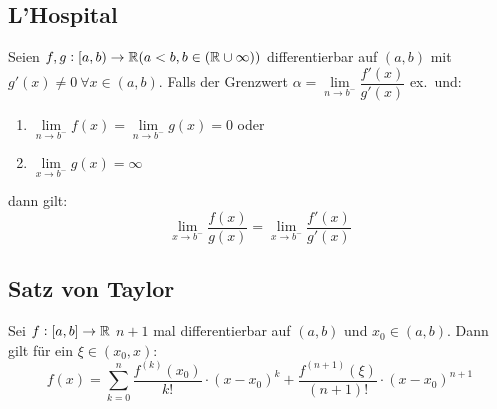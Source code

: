 \subsection{L'Hospital}
Seien $f,g: [a,b) \rightarrow \mathbb{R} (a < b, b \in (\mathbb{R} \cup {\infty}))$
differentierbar auf $(a,b)$ mit $g'(x) \neq 0\ \forall x \in (a,b)$. Falls
der Grenzwert $\alpha = \lim\limits_{n \rightarrow b^-} \dfrac{f'(x)}{g'(x)}$
ex.\ und:
\begin{enumerate}[label= (\alph*)]
    \item $\lim\limits_{n \rightarrow b^-} f(x) =
        \lim\limits_{n \rightarrow b^-} g(x) = 0$ oder
    \item $\lim\limits_{x \rightarrow b^-} g(x) = \infty$
\end{enumerate}
dann gilt:
\begin{equation*}
    \lim_{x \rightarrow b^-} \frac{f(x)}{g(x)} =
    \lim_{x \rightarrow b^-} \frac{f'(x)}{g'(x)}
\end{equation*}

\subsection{Satz von Taylor}
Sei $f: [a,b] \rightarrow \mathbb{R}$ $n+1$ mal differentierbar auf $(a,b)$ und
$x_0 \in (a,b)$. Dann gilt für ein $\xi \in (x_0, x)$:
\begin{equation*}
    f(x) = \sum_{k=0}^n \frac{f^{(k)}(x_0)}{k!} \cdot {(x-x_0)}^k +
    \frac{f^{(n+1)}(\xi)}{(n+1)!} \cdot {(x-x_0)}^{n+1}
\end{equation*}
